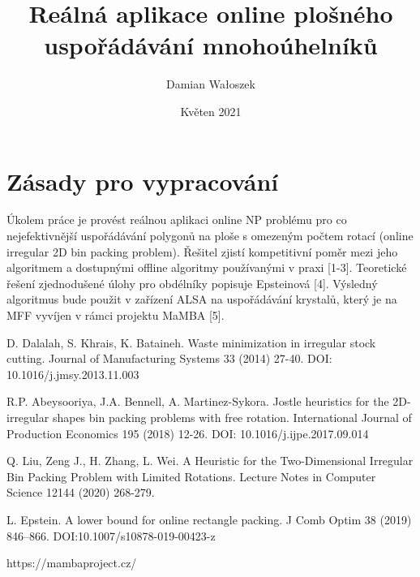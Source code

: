 \documentclass{article}
\title{Reálná aplikace online plošného uspořádávání mnohoúhelníků}
\author{Damian Wałoszek}
\date{Květen 2021}
\begin{document}
\maketitle

\section{Zásady pro vypracování}

Úkolem práce je provést reálnou aplikaci online NP problému pro co nejefektivnější uspořádávání polygonů na ploše s omezeným počtem rotací (online irregular 2D bin packing problem). Řešitel zjistí kompetitivní poměr mezi jeho algoritmem a dostupnými offline algoritmy používanými v praxi [1-3]. Teoretické řešení zjednodušené úlohy pro obdélníky popisuje Epsteinová [4]. Výsledný algoritmus bude použit v zařízení ALSA na uspořádávání krystalů, který je na MFF vyvíjen v rámci projektu MaMBA [5].

\begin{enumerate}[label={[\arabic*]}]
\item D. Dalalah, S. Khrais, K. Bataineh. Waste minimization in irregular stock cutting. Journal of Manufacturing Systems 33 (2014) 27-40. DOI: 10.1016/j.jmsy.2013.11.003
\item R.P. Abeysooriya, J.A. Bennell, A. Martinez-Sykora. Jostle heuristics for the 2D-irregular shapes bin packing problems with free rotation. International Journal of Production Economics 195 (2018)   12-26. DOI: 10.1016/j.ijpe.2017.09.014
\item Q. Liu, Zeng J., H. Zhang, L. Wei. A Heuristic for the Two-Dimensional Irregular Bin Packing Problem with Limited Rotations. Lecture Notes in Computer Science 12144 (2020) 268-279.
\item L. Epstein. A lower bound for online rectangle packing. J Comb Optim 38 (2019) 846–866. DOI:10.1007/s10878-019-00423-z 
\item https://mambaproject.cz/
\end{enumerate}
\end{document}

